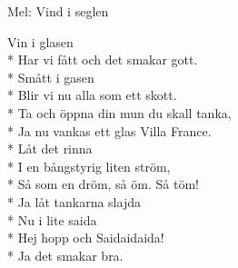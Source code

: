 \begin{SongText}
    \begin{SongInfo}
        Mel: Vind i seglen
    \end{SongInfo}
    \begin{SongVerse}
        Vin i glasen\\*%
        Har vi fått och det smakar gott.\\*%
        Smått i gasen\\*%
        Blir vi nu alla som ett skott.\\*%
        Ta och öppna din mun du skall tanka,\\*%
        Ja nu vankas ett glas Villa France.\\*%
        Låt det rinna\\*%
        I en bångstyrig liten ström,\\*%
        Så som en dröm, så öm. Så töm!\\*%
        Ja låt tankarna slajda\\*%
        Nu i lite saida\\*%
        Hej hopp och Saidaidaida!\\*%
        Ja det smakar bra.
    \end{SongVerse}
\end{SongText}